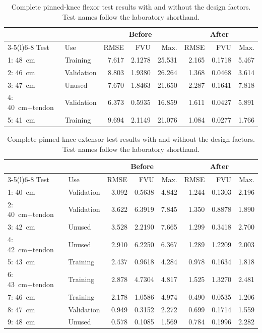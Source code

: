 \begin{table}[htbp]
\centering\small\setlength{\tabcolsep}{3pt}
\caption{Complete pinned-knee flexor test results with and without the design factors. Test names follow the laboratory shorthand.}
\label{tab:app_gof}
\begin{tabular}{@{}llrrrrrr@{}}
\toprule
 & & \multicolumn{3}{c}{Before} & \multicolumn{3}{c}{After} \\
\cmidrule(lr){3-5}\cmidrule(l){6-8}
Test & Use & RMSE & FVU & Max. & RMSE & FVU & Max. \\
\midrule
1: \qty{48}{\cm} & Training & 7.617 & 2.1278 & 25.531 & 2.165 & 0.1718 & 5.467 \\
2: \qty{46}{\cm} & Validation & 8.803 & 1.9380 & 26.264 & 1.368 & 0.0468 & 3.614 \\
3: \qty{47}{\cm} & Unused & 7.670 & 1.8463 & 21.650 & 2.287 & 0.1641 & 7.818 \\
4: \qty{40}{\cm}+tendon & Validation & 6.373 & 0.5935 & 16.859 & 1.611 & 0.0427 & 5.891 \\
5: \qty{41}{\cm} & Training & 9.694 & 2.1149 & 21.076 & 1.084 & 0.0277 & 1.766 \\
\bottomrule
\end{tabular}
\end{table}

\begin{table}[htbp]
\centering\small\setlength{\tabcolsep}{3pt}
\caption{Complete pinned-knee extensor test results with and without the design factors. Test names follow the laboratory shorthand.}
\label{tab:app_gof_ext_all}
\begin{tabular}{@{}llrrrrrr@{}}
\toprule
 & & \multicolumn{3}{c}{Before} & \multicolumn{3}{c}{After} \\
\cmidrule(lr){3-5}\cmidrule(l){6-8}
Test & Use & RMSE & FVU & Max. & RMSE & FVU & Max. \\
\midrule
1: \qty{40}{\cm} & Validation & 3.092 & 0.5638 & 4.842 & 1.244 & 0.1303 & 2.196 \\
2: \qty{40}{\cm}+tendon & Validation & 3.622 & 6.3919 & 7.845 & 1.350 & 0.8878 & 1.890 \\
3: \qty{42}{\cm} & Unused & 3.528 & 2.2190 & 7.665 & 1.299 & 0.3418 & 2.700 \\
4: \qty{42}{\cm}+tendon & Unused & 2.910 & 6.2250 & 6.367 & 1.289 & 1.2209 & 2.003 \\
5: \qty{43}{\cm} & Training & 2.437 & 0.9618 & 4.284 & 0.978 & 0.1634 & 1.818 \\
6: \qty{43}{\cm}+tendon & Training & 2.878 & 4.7304 & 4.817 & 1.525 & 1.3270 & 2.481 \\
7: \qty{46}{\cm} & Training & 2.178 & 1.0586 & 4.974 & 0.490 & 0.0535 & 1.206 \\
8: \qty{47}{\cm} & Validation & 0.949 & 0.3152 & 2.272 & 0.699 & 0.1714 & 1.559 \\
9: \qty{48}{\cm} & Unused & 0.578 & 0.1085 & 1.569 & 0.784 & 0.1996 & 2.282 \\
\bottomrule
\end{tabular}
\end{table}

